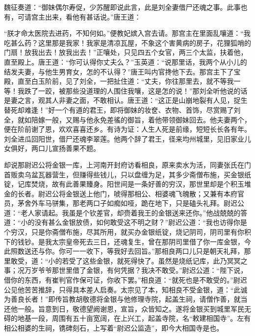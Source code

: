 \documentclass[12pt]{lsbook}
\begin{document}
魏征奏道：“御妹偶尔寿促，少苏醒即说此言，此是刘全妻借尸还魂之事。此事也有，可请宫主出来，看他有甚话说。”唐王道：

“朕才命太医院去进药，不知何如。”便教妃嫔入宫去请。那宫主在里面乱嚷道：“我吃甚么药？这里那是我家！我家是清凉瓦屋，不象这个害黄病的房子，花狸狐哨的门扇！放我出去！放我出去！”正嚷处，只见四五个女官，两三个太监，扶着他，直至殿上。唐王道：“你可认得你丈夫么？”玉英道：“说那里话，我两个从小儿的结发夫妻，与他生男育女，怎的不认得？”唐王叫内官搀他下去。那宫主下了宝殿，直至白玉阶前，见了刘全，一把扯住道：“丈夫，你往那里去，就不等我一等！我跌了一跤，被那些没道理的人围住我嚷，这是怎的说！”那刘全听他说的话是妻之言，观其人非妻之面，不敢相认。唐王道：“这正是山崩地裂有人见，捉生替死却难逢！”好一个有道的君王，即将御妹的妆奁、衣物、首饰，尽赏赐了刘全，就如陪嫁一般，又赐与他永免差徭的御旨，着他带领御妹回去。他夫妻两个，便在阶前谢了恩，欢欢喜喜还乡。有诗为证：人生人死是前缘，短短长长各有年。刘全进瓜回阳世，借尸还魂李翠莲。他两个辞了君王，径来均州城里，见旧家业儿女俱好，两口儿宣扬善果不题。

却说那尉迟公将金银一库，上河南开封府访看相良，原来卖水为活，同妻张氏在门首贩卖乌盆瓦器营生，但赚得些钱儿，只以盘缠为足，其多少斋僧布施，买金银纸锭，记库焚烧，故有此善果臻身。阳世间是一条好善的穷汉，那世里却是个积玉堆金的长者。尉迟公将金银送上他门，唬得那相公、相婆魂飞魄散；又兼有本府官员，茅舍外车马骈集，那老两口子如痴如哑，跪在地下，只是磕头礼拜。尉迟公道：“老人家请起。我虽是个钦差官，却赍着我王的金银送来还你。”他战兢兢的答道：“小的没有甚么金银放债，如何敢受这不明之财？”尉迟公道：“我也访得你是个穷汉，只是你斋僧布施，尽其所用，就买办金银纸锭，烧记阴司，阴司里有你积下的钱钞。是我太宗皇帝死去三日，还魂复生，曾在那阴司里借了你一库金银，今此照数送还与你。你可一一收下，等我好去回旨。”那相良两口儿只是朝天礼拜，那里敢受，道：“小的若受了这些金银，就死得快了。虽然是烧纸记库，此乃冥冥之事；况万岁爷爷那世里借了金银，有何凭据？我决不敢受。”尉迟公道：“陛下说，借你的东西，有崔判官作保可证，你收下罢。”相良道：“就死也是不敢受的。”尉迟公见他苦苦推辞，只得具本差人启奏。太宗见了本，知相良不受金银，道：“此诚为善良长者！”即传旨教胡敬德将金银与他修理寺院，起盖生祠，请僧作善，就当还他一般。旨意到日，敬德望阙谢恩，宣旨，众皆知之。遂将金银买到城里军民无碍的地基一段，周围有五十亩宽阔，在上兴工，起盖寺院，名“敕建相国寺”。左有相公相婆的生祠，镌碑刻石，上写着“尉迟公监造”，即今大相国寺是也。
\end{document}
